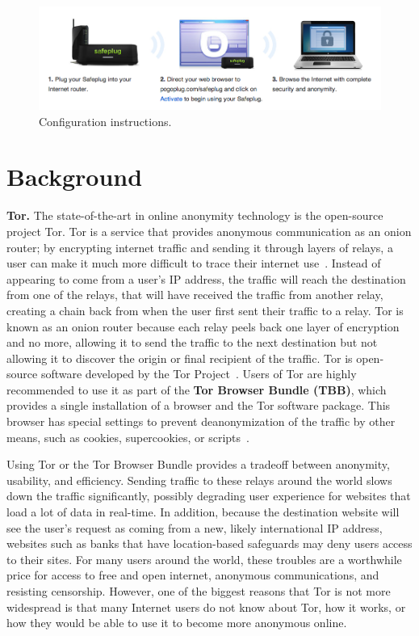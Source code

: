 \documentclass[conference]{IEEEtran}
\begin{document}
\begin{figure}
\begin{center}
\includegraphics[width=.75\textwidth]{instructions}
\caption{Configuration instructions.}
\label{fig:instructions}
\end{center}
\end{figure}  

\section{Background}
{\bf Tor.} The state-of-the-art in online anonymity technology is the open-source project Tor.  Tor is a service that provides anonymous communication as an onion router; by encrypting internet traffic and sending it through layers of relays, a user can make it much more difficult to trace their internet use~\cite{tor}.  Instead of appearing to come from a user's IP address, the traffic will reach the destination from one of the relays, that will have received the traffic from another relay, creating a chain back from when the user first sent their traffic to a relay.  Tor is known as an onion router because each relay peels back one layer of encryption and no more, allowing it to send the traffic to the next destination but not allowing it to discover the origin or final recipient of the traffic.  Tor is open-source software developed by the Tor Project~\cite{torproject}.  Users of Tor are highly recommended to use it as part of the {\bf Tor Browser Bundle (TBB)}, which provides a single installation of a browser and the Tor software package.  This browser has special settings to prevent deanonymization of the traffic by other means, such as cookies, supercookies, or scripts~\cite{torproject}.

Using Tor or the Tor Browser Bundle provides a tradeoff between anonymity, usability, and efficiency.  Sending traffic to these relays around the world slows down the traffic significantly, possibly degrading user experience for websites that load a lot of data in real-time.  In addition, because the destination website will see the user's request as coming from a new, likely international IP address, websites such as banks that have location-based safeguards may deny users access to their sites.  For many users around the world, these troubles are a worthwhile price for access to free and open internet, anonymous communications, and resisting censorship.  However, one of the biggest reasons that Tor is not more widespread is that many Internet users do not know about Tor, how it works, or how they would be able to use it to become more anonymous online.
\end{document}
